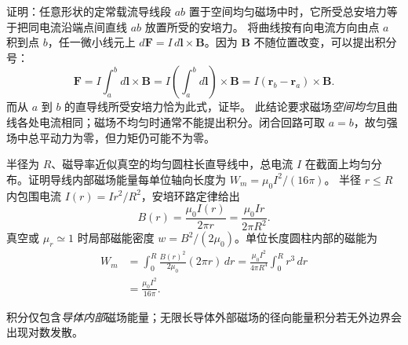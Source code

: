 \problemtext 证明：任意形状的定常载流导线段 $ab$ 置于空间均匀磁场中时，它所受总安培力等于把同电流沿端点间直线 $ab$ 放置所受的安培力。
\workings 将曲线按有向电流方向由点 $a$ 积到点 $b$，任一微小线元上
$d\bm F=I\,d\bm l\times\bm B$。因为 $\bm B$ 不随位置改变，可以提出积分号：
\[
\bm F=I\int_a^b d\bm l\times\bm B
=I\left(\int_a^b d\bm l\right)\times\bm B
=\boxed{I(\bm r_b-\bm r_a)\times\bm B}.
\]
而从 $a$ 到 $b$ 的直导线所受安培力恰为此式，证毕。
\crosscheck 此结论要求磁场\emph{空间均匀}且曲线各处电流相同；磁场不均匀时通常不能提出积分。闭合回路可取 $a=b$，故匀强场中总平动力为零，但力矩仍可能不为零。

\problemtext 半径为 $R$、磁导率近似真空的均匀圆柱长直导线中，总电流 $I$ 在截面上均匀分布。证明导线内部磁场能量每单位轴向长度为 $W_m=\mu_0 I^2/(16\pi)$。
\workings 半径 $r\le R$ 内包围电流 $I(r)=I r^2/R^2$，安培环路定律给出
\[
B(r)=\frac{\mu_0 I(r)}{2\pi r}
=\frac{\mu_0I r}{2\pi R^2}.
\]
真空或 $\mu_r\simeq1$ 时局部磁能密度 $w=B^2/(2\mu_0)$。单位长度圆柱内部的磁能为
\[
\begin{aligned}
W_m&=\int_0^R\frac{B(r)^2}{2\mu_0}(2\pi r)\,dr
=\frac{\mu_0 I^2}{4\pi R^4}\int_0^R r^3\,dr\\
&=\boxed{\frac{\mu_0 I^2}{16\pi}}.
\end{aligned}
\]

\crosscheck 积分仅包含\emph{导体内部}磁场能量；无限长导体外部磁场的径向能量积分若无外边界会出现对数发散。
